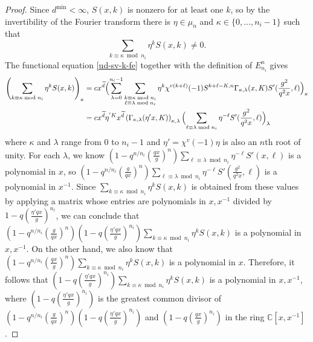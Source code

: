 \documentclass[11pt,letterpaper]{article}
\theoremstyle{definition}
\theoremstyle{remark}
\numberwithin{equation}{section}
\theoremstyle{dotless}
\renewcommand{\tilde}{\widetilde}
\begin{document}
\begin{proof} Since $d^{\mathrm{min}}<\infty$,  $S(x,k) $ is nonzero for at least one $k$, so by the invertibility of the Fourier transform there is $\eta\in \mu_n$ and $\kappa \in \{0,\dots,n_i-1\}$ such that 
\begin{equation}\label{k-Snonzero}  \sum_{k \equiv \kappa \bmod n_i}  \eta^{k} S(x,k) \neq 0.\end{equation}
The functional equation \eqref{ud-sv-k-fe} together with the definition of $E_{n_i}^n$ gives
\begin{equation*}
\begin{split}
\left(\sum_{k \equiv \kappa \bmod n_i}  \eta^{k} S(x,k) \right)_\kappa &= c x^{\tilde{d}} \Bigl(\sum_{\lambda=0}^{n_i-1} \sum_{\substack{k \equiv \kappa \bmod n_i \\ \ell \equiv \lambda \bmod n_i}} \eta^{k} \chi^{v(k+\ell)}(-1) S^{k+\ell-K, n} \Gamma_{\kappa, \lambda}(x,K) S'(\frac{g^2}{q^2x} ,\ell) \Bigr)_\kappa\\
&=c x^{\tilde{d}} \eta^{'K}   x^{\tilde{d}} \left( \Gamma_{\kappa, \lambda}( \eta'  x, K) \right) _{\kappa, \lambda } \Bigl( \sum_{\ell \equiv \lambda \bmod n_i} \eta^{-\ell} S'(\frac{g^2}{q^2x} ,\ell)\Bigr)_\lambda
\end{split}
\end{equation*}
where $\kappa$ and $\lambda$ range from $0$ to $n_i-1$ and $\eta' = \chi^v(-1) \eta$ is also an $n$th root of unity. For each $\lambda$, we know $(1- q^{n/n_i} \left( \frac{q x}{g}\right)^{n} )  \sum_{\ell \equiv \lambda \bmod n_i} \eta^{-\ell} S'(x ,\ell)$ is a polynomial in $x$, so  $\label{entries-to-obtain} (1- q^{n/n_i} \left( \frac{g}{qx }\right)^{n} ) \sum_{\ell \equiv \lambda \bmod n_i} \eta^{-\ell} S'(\frac{g^2}{q^2x} ,\ell)$ is a polynomial in $x^{-1}$.  Since $\sum_{k \equiv \kappa \bmod n_i}  \eta^{k} S(x,k)$ is obtained from these values by applying a matrix whose entries are polynomials in $x,x^{-1}$ divided by $1- q \left(\frac{ \eta'  qx}{g} \right)^{n_i}$, we can conclude that $(1- q^{n/n_i} \left( \frac{g}{qx }\right)^{n} )  (1- q \left(\frac{ \eta' qx}{g} \right)^{n_i}) \sum_{k \equiv \kappa \bmod n_i}  \eta^{k} S(x,k)$ is a polynomial in $x, x^{-1}$. On the other hand, we also know that $(1- q^{n/n_i} \left( \frac{qx}{g }\right)^{n} )  \sum_{k \equiv \kappa \bmod n_i}  \eta^{k} S(x,k)$ is a polynomial in $x$. Therefore, it follows that $(1 - q \left( \frac{ \eta' qx}{g} \right)^{n_i} )   \sum_{k \equiv \kappa \bmod n_i}  \eta^{k} S(x,k)$ is a polynomial in $x,x^{-1}$, where $(1 - q \left( \frac{\eta'  qx}{g} \right)^{n_i} )$ is the greatest common divisor of $(1- q^{n/n_i} \left( \frac{g}{qx }\right)^{n} )  (1- q \left(\frac{ \eta'  qx}{g} \right)^{n_i})$  and $(1 - q \left( \frac{qx}{g} \right)^{n_i} ) $ in the ring $\mathbb C[x,x^{-1}]$.


\end{proof}
\end{document}

